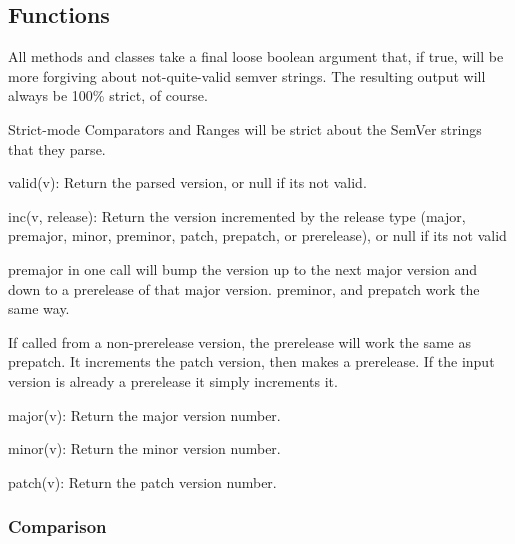 \subsection*{Functions}

All methods and classes take a final {\ttfamily loose} boolean argument that, if true, will be more forgiving about not-\/quite-\/valid semver strings. The resulting output will always be 100\% strict, of course.

Strict-\/mode Comparators and Ranges will be strict about the Sem\+Ver strings that they parse.


\begin{DoxyItemize}
\item {\ttfamily valid(v)}\+: Return the parsed version, or null if it\textquotesingle{}s not valid.
\item {\ttfamily inc(v, release)}\+: Return the version incremented by the release type ({\ttfamily major}, {\ttfamily premajor}, {\ttfamily minor}, {\ttfamily preminor}, {\ttfamily patch}, {\ttfamily prepatch}, or {\ttfamily prerelease}), or null if it\textquotesingle{}s not valid
\begin{DoxyItemize}
\item {\ttfamily premajor} in one call will bump the version up to the next major version and down to a prerelease of that major version. {\ttfamily preminor}, and {\ttfamily prepatch} work the same way.
\item If called from a non-\/prerelease version, the {\ttfamily prerelease} will work the same as {\ttfamily prepatch}. It increments the patch version, then makes a prerelease. If the input version is already a prerelease it simply increments it.
\end{DoxyItemize}
\item {\ttfamily major(v)}\+: Return the major version number.
\item {\ttfamily minor(v)}\+: Return the minor version number.
\item {\ttfamily patch(v)}\+: Return the patch version number.
\end{DoxyItemize}

\subsubsection*{Comparison}


